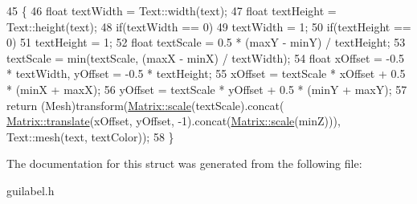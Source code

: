 \begin{DoxyCode}
45     \{
46         \textcolor{keywordtype}{float} textWidth = Text::width(text);
47         \textcolor{keywordtype}{float} textHeight = Text::height(text);
48         \textcolor{keywordflow}{if}(textWidth == 0)
49             textWidth = 1;
50         \textcolor{keywordflow}{if}(textHeight == 0)
51             textHeight = 1;
52         \textcolor{keywordtype}{float} textScale = 0.5 * (maxY - minY) / textHeight;
53         textScale = min(textScale, (maxX - minX) / textWidth);
54         \textcolor{keywordtype}{float} xOffset = -0.5 * textWidth, yOffset = -0.5 * textHeight;
55         xOffset = textScale * xOffset + 0.5 * (minX + maxX);
56         yOffset = textScale * yOffset + 0.5 * (minY + maxY);
57         \textcolor{keywordflow}{return} (Mesh)transform(\hyperlink{classMatrix_a1f36f7f62b8e99fea99880b6fc80a604}{Matrix::scale}(textScale).concat(
      \hyperlink{classMatrix_adf246c47bce77c3c53b9e804ec475e35}{Matrix::translate}(xOffset, yOffset, -1).concat(\hyperlink{classMatrix_a1f36f7f62b8e99fea99880b6fc80a604}{Matrix::scale}(minZ))), 
      Text::mesh(text, textColor));
58     \}
\end{DoxyCode}


The documentation for this struct was generated from the following file\+:\begin{DoxyCompactItemize}
\item 
guilabel.\+h\end{DoxyCompactItemize}

